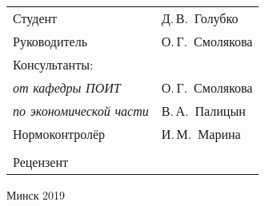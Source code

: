\begin{titlepage}
\begin{center}
    \begin{tabular}{ p{}p{} }
      Студент & Д.\,В.~Голубко \\
      Руководитель & О.\,Г.~Смолякова \\
      Консультанты: &\\
      \hspace*{3ex}\emph{от кафедры ПОИТ} & О.\,Г.~Смолякова \\
      \hspace*{3ex}\emph{по экономической части} & В.\,А.~Палицын \\
      Нормоконтролёр & И.\,М.~Марина\\
      & \\
      Рецензент &
    \end{tabular}
    
    \vfill
    {\normalsize Минск 2019}
  \end{center}
\end{titlepage}
